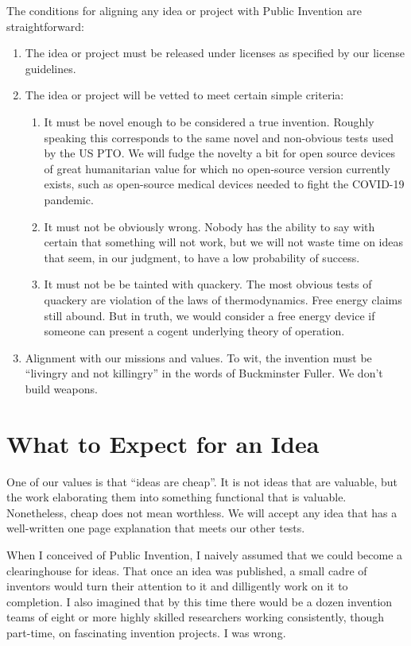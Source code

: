 \documentclass[
	fontsize=10pt, %
	twoside=false, %
	secnumdepth=1, %
]{kaobook}
\begin{document}
The conditions for aligning any idea or project with Public Invention are straightforward:
\begin{enumerate}
\item The idea or project must be released under licenses as specified by our license guidelines.
\item The idea or project will be vetted to meet certain simple criteria:
  \begin{enumerate}
  \item It must be novel enough to be considered a true invention. Roughly speaking this corresponds to the same novel and non-obvious tests used by the US PTO.
    We will fudge the novelty a bit for open source devices of great humanitarian value for which no open-source version currently exists,
    such as open-source medical devices needed to fight the COVID-19 pandemic.
  \item It must not be obviously wrong. Nobody has the ability to say with certain that something will not work, but we will not waste time on ideas that seem,
    in our judgment, to have a low probability of success.
  \item
    It must not be be tainted with quackery. The most obvious tests of quackery are violation of the laws of thermodynamics. Free energy claims still abound.
    But in truth, we would consider a free energy device if someone can present a cogent underlying theory of operation.
  \end{enumerate}
  \item Alignment with our missions and values. To wit, the invention must be ``livingry and not killingry'' in the words of Buckminster Fuller. We don't build weapons.
\end{enumerate}

\section{What to Expect for an Idea}
One of our values is that ``ideas are cheap''. It is not ideas that are valuable, but the work elaborating them into something functional that is valuable.
Nonetheless, cheap does not mean worthless. We will accept any idea that has a well-written one page explanation that meets our other tests.

When I conceived of Public Invention, I naively assumed that we could become a clearinghouse for ideas.
That once an idea was published, a small cadre of inventors would turn their attention to it and dilligently work on it to completion.
I also imagined that by this time there would be a dozen invention teams of eight or more highly skilled researchers working consistently, though part-time,
on fascinating invention projects. I was wrong.
\end{document}
